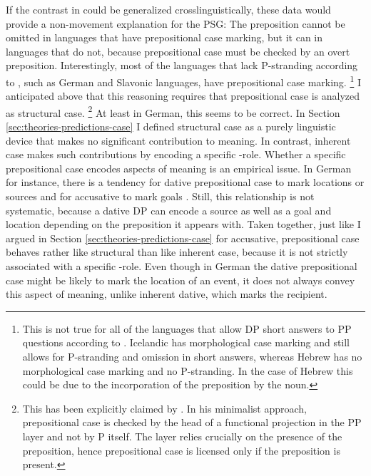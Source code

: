 \largerpage
If the contrast in \LLast could be generalized crosslinguistically, these data would provide a non-movement explanation for the PSG: The preposition cannot be omitted in languages that have prepositional case marking, but it can in languages that do not, because prepositional case must be checked by an overt preposition. Interestingly, most of the languages that lack P-stranding according to \citet{merchant2004}, such as German and Slavonic languages, have prepositional case marking.%
%
\footnote{This is not true for all of the languages that allow DP short answers to PP questions according to \citet{merchant2004}. Icelandic has morphological case marking and still allows for P-stranding and omission in short answers, whereas Hebrew has no morphological case marking and no P-stranding. In the case of Hebrew this could be due to the incorporation of the preposition by the noun. %
}\afterfn%
%
I anticipated above that this reasoning requires that prepositional case is analyzed as structural case.%
% 
\footnote{
This has been explicitly claimed by \citet[24]{dendikken2013}. In his minimalist approach, prepositional case is checked by the head of a functional projection in the PP layer and not by P itself. The layer relies crucially on the presence of the preposition, hence prepositional case is licensed only if the preposition is present.}\afterfn%
%
At least in German, this seems to be correct. In Section \ref{sec:theories-predictions-case} I defined structural case as a purely linguistic device that makes no significant contribution to meaning. In contrast, inherent case makes such contributions by encoding a specific \texttheta-role. Whether a specific prepositional case encodes aspects of meaning is an empirical issue. In German for instance, there is a tendency for dative prepositional case to mark locations or sources and for accusative to mark goals \citep[8]{zwarts2005}. Still, this relationship is not systematic, because a dative DP can encode a source \Next[a] as well as a goal \Next[b] and location \Next[c] depending on the preposition it appears with. Taken together, just like I argued in Section \ref{sec:theories-predictions-case} for accusative, prepositional case behaves rather like structural than like inherent case, because it is not strictly associated with a specific \texttheta-role. Even though in German the dative prepositional case might be likely to mark the location of an event, it does not always convey this aspect of meaning, unlike inherent dative, which marks the recipient.

